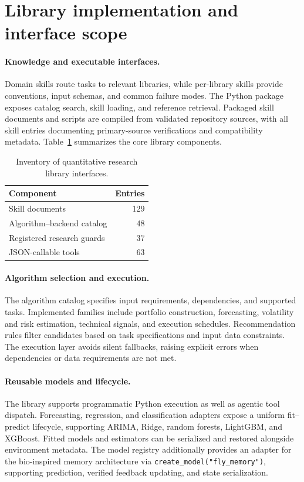 \section{Library implementation and interface scope}
\label{app:library}
\paragraph{Knowledge and executable interfaces.}
Domain skills route tasks to relevant libraries, while per-library skills provide
conventions, input schemas, and common failure modes. The Python package exposes
catalog search, skill loading, and reference retrieval. Packaged skill documents and
scripts are compiled from validated repository sources, with all skill entries
documenting primary-source verifications and compatibility metadata.
Table~\ref{tab:inventory} summarizes the core library components.

\begin{table}[t]
\centering\small
\begin{tabular}{lr}
\toprule
Component & Entries \\
\midrule
Skill documents & 129 \\
Algorithm--backend catalog & 48 \\
Registered research guards & 37 \\
JSON-callable tools & 63 \\
\bottomrule
\end{tabular}
\caption{Inventory of quantitative research library interfaces.}
\label{tab:inventory}
\end{table}

\paragraph{Algorithm selection and execution.}
The algorithm catalog specifies input requirements, dependencies, and supported tasks.
Implemented families include portfolio construction, forecasting, volatility and risk
estimation, technical signals, and execution schedules. Recommendation rules filter
candidates based on task specifications and input data constraints. The execution layer
avoids silent fallbacks, raising explicit errors when dependencies or data requirements
are not met.

\paragraph{Reusable models and lifecycle.}
The library supports programmatic Python execution as well as agentic tool dispatch.
Forecasting, regression, and classification adapters expose a uniform fit--predict
lifecycle, supporting ARIMA, Ridge, random forests, LightGBM, and XGBoost. Fitted models
and estimators can be serialized and restored alongside environment metadata. The model
registry additionally provides an adapter for the bio-inspired memory architecture via
\texttt{create\_model("fly\_memory")}, supporting prediction, verified feedback updating,
and state serialization.

